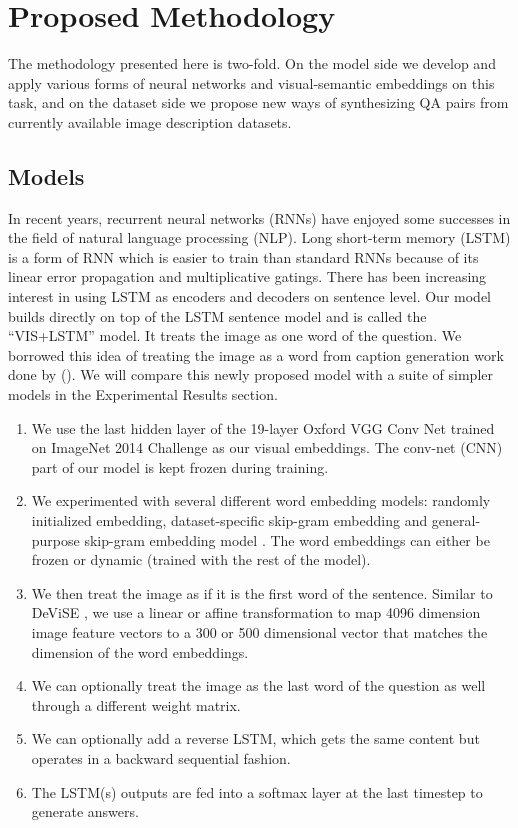 \documentclass{article}
\renewcommand{\*}[1]{\textbf{#1}}
\newcommand{\shortcite}[1]{\citeauthor{#1} (\citeyear{#1})}
\begin{document}
\section{Proposed Methodology}
The methodology presented here is two-fold. On the model side we develop and 
apply various forms of neural networks and visual-semantic embeddings on this 
task, and on the dataset  side we propose new ways of synthesizing QA pairs 
from currently available image description datasets.

\subsection{Models}
In recent years, recurrent neural networks (RNNs) have enjoyed some successes 
in the field of natural language processing (NLP). Long short-term memory
(LSTM) \cite{hochreiter97} is a form of RNN which is easier to train than 
standard RNNs because of its linear error propagation and multiplicative 
gatings. There has been increasing interest in using LSTM as encoders and 
decoders on sentence level. 
Our model builds directly on top of the LSTM sentence model and is called the 
``VIS+LSTM'' model. It treats the image as one word of the question. We 
borrowed this idea of treating the image as a word from caption generation work 
done by \shortcite{vinyals14}. We will compare this newly proposed model with a 
suite of simpler models in the Experimental Results section.

\begin{enumerate}
\item We use the last hidden layer of the 19-layer Oxford VGG Conv Net
\cite{simonyan14} trained on ImageNet 2014 Challenge \cite{ilsvrc14} as our 
visual embeddings. The conv-net (CNN) part of our model is kept frozen 
during training. 
\item We experimented with several different word embedding models: randomly 
initialized embedding, dataset-specific skip-gram embedding and  
general-purpose skip-gram embedding model \cite{mikolov13}. The word embeddings 
can either be frozen or dynamic (trained with the rest of the model).
\item We then treat the image as if it is the first word of the sentence. 
Similar to DeViSE \cite{frome13}, we use a linear or affine transformation to 
map 4096 dimension image feature vectors to a 300 or 500 dimensional vector 
that matches the dimension of the word embeddings.
\item We can optionally treat the image as the last word of the question as 
well through a different weight matrix. 
\item We can optionally add a reverse LSTM, which gets the same content but 
operates in a backward sequential fashion.
\item The LSTM(s) outputs are fed into a softmax layer at the last timestep to 
generate answers.
\end{enumerate}
\end{document}
